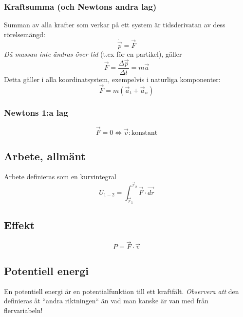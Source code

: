 \documentclass{article}
\newenvironment{ankiflashcard}[1]{}{}
\begin{document}
\begin{paracol}{2}
\begin{ankiflashcard}{Forumlera Newtons andra lag}
\subsubsection{Kraftsumma (och Newtons andra lag)}
Summan av alla krafter som verkar på ett system är tidsderivatan av dess rörelsemängd:
$$\dot{\vec p} = \vec F$$
\textit{Då massan inte ändras över tid} (t.ex för en partikel), gäller
$$\vec F= \frac{\Delta \vec p}{\Delta t} = m\vec a$$
Detta gäller i alla koordinatsystem, exempelvis i naturliga komponenter:
$$\vec F = m(\vec a_t + \vec a_n)$$
\end{ankiflashcard}


\begin{ankiflashcard}{Vad säger Newtons första lag?}
    
\subsubsection{Newtons 1:a lag}
$$\vec F = 0 \iff \vec v: \text{konstant}$$
\end{ankiflashcard}

\subsection{Arbete, allmänt}

\begin{ankiflashcard}{Definiera arbete (generella definitionen)}
Arbete definieras som en kurvintegral
$$
U_{1-2} = \int_{\vec r_1}^{\vec r_2} \vec F \cdot \vec{dr}
$$
\end{ankiflashcard}
\subsection{Effekt}
$$P = \vec F \cdot \vec v$$

\begin{ankiflashcard}{Definiera potentiell energi}
\subsection{Potentiell energi}
En potentiell energi är en potentialfunktion till ett kraftfält. \textit{Observera att} den definieras åt ``andra riktningen`` än vad man kanske är van med från flervariabeln!


\end{ankiflashcard}
\end{paracol}
\end{document}
